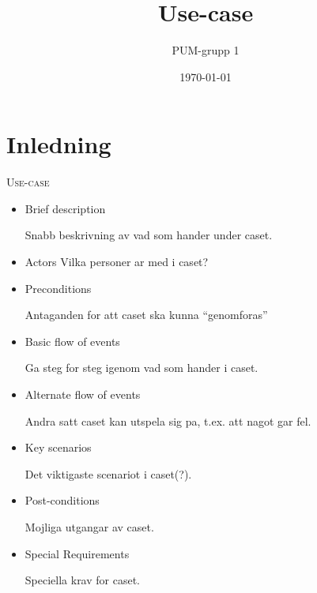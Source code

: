 

\ifpdf
\else
\fi

\title{Use-case}
\author{PUM-grupp 1}
\date{\today}



\maketitle\thispagestyle{empty}

\newpage

\section{Inledning}
\textsc{\LARGE Use-case}


\begin{itemize}
	\item Brief description
	
	Snabb beskrivning av vad som hander under caset.
	\item Actors
	Vilka personer ar med i caset?
	
	\item Preconditions
	
	Antaganden for att caset ska kunna "`genomforas"'
	\item Basic flow of events
	
	Ga steg for steg igenom vad som hander i caset.
	\item Alternate flow of events
	
	Andra satt caset kan utspela sig pa, t.ex. att nagot gar fel.
	\item Key scenarios
	
	Det viktigaste scenariot i caset(?).
	\item Post-conditions
	
	Mojliga utgangar av caset.
	\item Special Requirements
	
	Speciella krav for caset.
\end{itemize}


